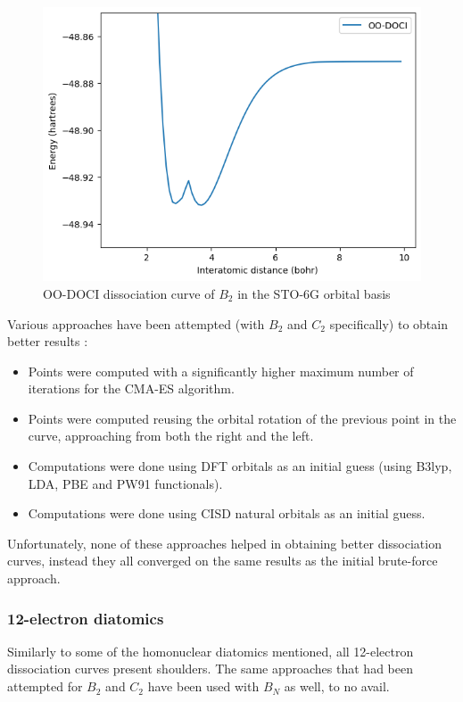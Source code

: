 \documentclass[twoside,twocolumn,9pt]{article}
\begin{document}
\begin{figure}[h]
  \includegraphics[width=\linewidth]{B2.png}
  \caption{OO-DOCI dissociation curve of $B_2$ in the STO-6G orbital basis}\label{B2_bad}
\end{figure}

Various approaches have been attempted (with $B_2$ and $C_2$ specifically) to obtain better results :

\begin{itemize}
  \item Points were computed with a significantly higher maximum number of iterations for the CMA-ES algorithm.
  \item Points were computed reusing the orbital rotation of the previous point in the curve, approaching from both the right and the left.
  \item Computations were done using DFT orbitals as an initial guess (using B3lyp, LDA, PBE and PW91 functionals).
  \item Computations were done using CISD natural orbitals as an initial guess.
\end{itemize}

Unfortunately, none of these approaches helped in obtaining better dissociation curves, instead they all converged on the same results as the initial brute-force approach.

\subsubsection{12-electron diatomics}

Similarly to some of the homonuclear diatomics mentioned, all 12-electron dissociation curves present shoulders. The same approaches that had been attempted for $B_2$ and $C_2$ have been used with $B_N$ as well, to no avail.
\end{document}
